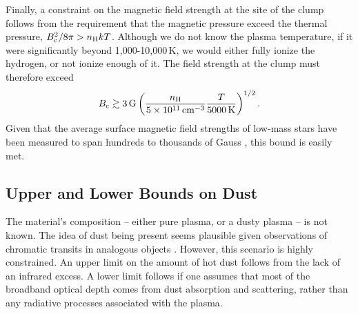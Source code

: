 \documentclass{nature3}
\begin{document}
\begin{methods}
Finally, a constraint on the magnetic field strength at the site of
the clump follows from the requirement that the magnetic pressure
exceed the thermal pressure, $B_{\rm c}^2 / 8\pi > n_{\rm H} k T$.  Although
we do not know the plasma temperature, if it were significantly beyond
1,000-10,000\,K, we would either fully ionize the hydrogen, or not
ionize enough of it.  The field strength at the clump must therefore
exceed
\begin{equation}
  B_{\rm c} \gtrsim 3\,{\rm G}
  \left(
  \frac{n_{\rm H}}{5\times10^{11}\,{\rm cm}^{-3}}
  \frac{T}{5000\,{\rm K}}
  \right)^{1/2}.
\end{equation}
Given that the average surface magnetic field strengths of low-mass
stars have been measured to span hundreds to thousands of Gauss
\cite{Donati2009,Kochukhov2021,Reiners2022}, this bound is easily met.

\subsection{Upper and Lower Bounds on Dust}\phantom{+}
\label{subsec:dust}

The material's composition -- either pure plasma, or a dusty plasma --
is not known.  The idea of dust being present seems plausible given
observations of chromatic transits in analogous objects
\cite{Tanimoto2020,Gunther2022,Koen2023}.  However, this scenario is
highly constrained.  An upper limit on the amount of hot dust follows
from the lack of an infrared excess.  A lower limit follows if one
assumes that most of the broadband optical depth comes from dust
absorption and scattering, rather than any radiative processes
associated with the plasma.


\end{methods}
\end{document}
